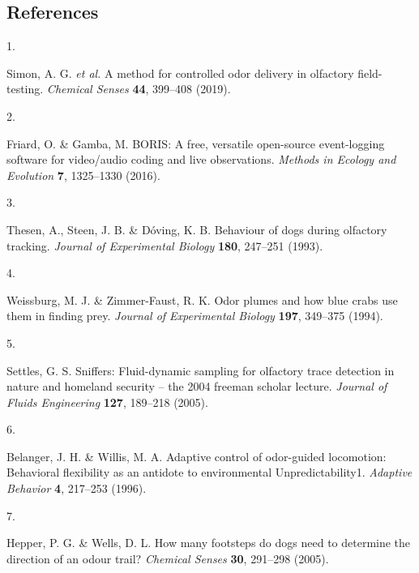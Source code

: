 \documentclass[
]{article}
\newlength{\cslhangindent}
\newlength{\csllabelwidth}
\newlength{\cslentryspacingunit} %
\newenvironment{CSLReferences}[2] %
 {%
  \setlength{\parindent}{0pt}
  \ifodd #1
  \let\oldpar\par
  \def\par{\hangindent=\cslhangindent\oldpar}
  \fi
  \setlength{\parskip}{#2\cslentryspacingunit}
 }%
 {}
\newcommand{\CSLLeftMargin}[1]{\parbox[t]{\csllabelwidth}{#1}}
\newcommand{\CSLRightInline}[1]{\parbox[t]{\linewidth - \csllabelwidth}{#1}\break}
\begin{document}
\hypertarget{references}{%
\subsection*{References}\label{references}}

\hypertarget{refs}{}
\begin{CSLReferences}{0}{0}
\leavevmode{}%
\CSLLeftMargin{1. }%
\CSLRightInline{Simon, A. G. \emph{et al.} A method for controlled odor delivery in olfactory field-testing. \emph{Chemical Senses} \textbf{44}, 399--408 (2019).}

\leavevmode{}%
\CSLLeftMargin{2. }%
\CSLRightInline{Friard, O. \& Gamba, M. {BORIS}: A free, versatile open-source event-logging software for video/audio coding and live observations. \emph{Methods in Ecology and Evolution} \textbf{7}, 1325--1330 (2016).}

\leavevmode{}%
\CSLLeftMargin{3. }%
\CSLRightInline{Thesen, A., Steen, J. B. \& Dóving, K. B. Behaviour of dogs during olfactory tracking. \emph{Journal of Experimental Biology} \textbf{180}, 247--251 (1993).}

\leavevmode{}%
\CSLLeftMargin{4. }%
\CSLRightInline{Weissburg, M. J. \& Zimmer-Faust, R. K. Odor plumes and how blue crabs use them in finding prey. \emph{Journal of Experimental Biology} \textbf{197}, 349--375 (1994).}

\leavevmode{}%
\CSLLeftMargin{5. }%
\CSLRightInline{Settles, G. S. Sniffers: Fluid-dynamic sampling for olfactory trace detection in nature and homeland security -- the 2004 freeman scholar lecture. \emph{Journal of Fluids Engineering} \textbf{127}, 189--218 (2005).}

\leavevmode{}%
\CSLLeftMargin{6. }%
\CSLRightInline{Belanger, J. H. \& Willis, M. A. Adaptive control of odor-guided locomotion: Behavioral flexibility as an antidote to environmental Unpredictability1. \emph{Adaptive Behavior} \textbf{4}, 217--253 (1996).}

\leavevmode{}%
\CSLLeftMargin{7. }%
\CSLRightInline{Hepper, P. G. \& Wells, D. L. How many footsteps do dogs need to determine the direction of an odour trail? \emph{Chemical Senses} \textbf{30}, 291--298 (2005).}


\end{CSLReferences}
\end{document}

